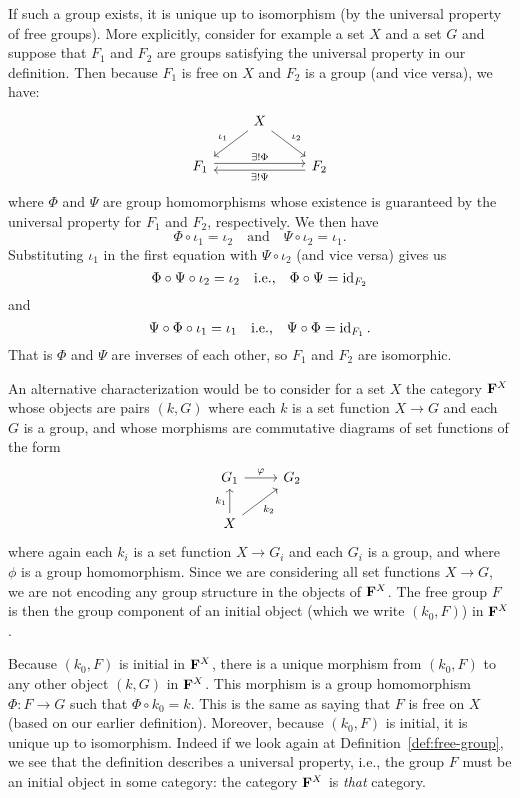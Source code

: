 If such a group exists, it is unique up to isomorphism (by the universal
property of free groups). More explicitly, consider for example a set \(X\) and
a set \(G\) and suppose that \(F_1\) and \(F_2\) are groups satisfying the
universal property in our definition. Then because \(F_1\) is free on \(X\) and
\(F_2\) is a group (and vice versa), we have:
\[
    \begin{tikzcd}
        & X \arrow[dl, "\iota_1"'] \arrow[dr, "\iota_2"] & \\
        F_1 \arrow[rr, "\exists!\Phi", shift left] & & F_2 \arrow[ll, "\exists!\Psi", shift left]
    \end{tikzcd}
\]
where \(\Phi\) and \(\Psi\) are group homomorphisms whose existence is
guaranteed by the universal property for \(F_1\) and \(F_2\), respectively. We
then have
\[
    \Phi \circ \iota_1 = \iota_2 \quad \text{and} \quad \Psi \circ \iota_2 = \iota_1.
\]
Substituting \(\iota_1\) in the first equation with \(\Psi \circ \iota_2\) (and
vice versa) gives us
\[
    \Phi \circ \Psi \circ \iota_2 = \iota_2 \quad \text{i.e.,} \quad \Phi \circ \Psi = \operatorname{id}_{F_2}
\]
and
\[
    \Psi \circ \Phi \circ \iota_1 = \iota_1 \quad \text{i.e.,} \quad \Psi \circ \Phi = \operatorname{id}_{F_1}.
\]
That is \(\Phi\) and \(\Psi\) are inverses of each other, so \(F_1\) and \(F_2\)
are isomorphic.

An alternative characterization would be to consider for a set \(X\) the
category \(\mathbf{F}^X\) whose objects are pairs \((k, G)\) where each \(k\) is a
set function \(X \to G\) and each \(G\) is a group, and whose morphisms are
commutative diagrams of set functions of the form
\[
    \begin{tikzcd}
        G_1 \arrow[r, "\phi"]                 & G_2 \\
        X \arrow[u, "k_1"] \arrow[ru, "k_2"'] &    
    \end{tikzcd}
\]
where again each \(k_i\) is a set function \(X \to G_i\) and each \(G_i\) is a
group, and where \(\phi\) is a group homomorphism. Since we are considering all
set functions \(X \to G\), we are not encoding any group structure in the
objects of \(\mathbf{F}^X\). The free group \(F\) is then the group component of
an initial object (which we write \((k_0, F)\)) in \(\mathbf{F}^X\).

Because \((k_0, F)\) is initial in \(\mathbf{F}^X\), there is a unique morphism
from \((k_0, F)\) to any other object \((k, G)\) in \(\mathbf{F}^X\). This
morphism is a group homomorphism \(\Phi: F \to G\) such that \(\Phi \circ k_0 =
k\). This is the same as saying that \(F\) is free on \(X\) (based on our
earlier definition). Moreover, because \((k_0, F)\) is initial, it is unique up
to isomorphism. Indeed if we look again at Definition~\ref{def:free-group}, we
see that the definition describes a universal property, i.e., the group \(F\)
must be an initial object in some category: the category \(\mathbf{F}^X\) is
\emph{that} category.

